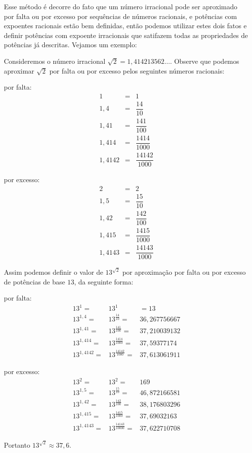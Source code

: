  Esse método é decorre do fato que um número irracional pode ser aproximado por falta ou por excesso por sequências de números racionais, e potências com expoentes racionais estão bem definidas, então podemos utilizar estes dois fatos e definir potências com expoente irracionais que satifazem todas as propriedades de potências já descritas. Vejamos um exemplo:
 
 \begin{exem}
 Consideremos o número irracional $\sqrt{2}= 1,414213562\ldots$. Observe que podemos aproximar $\sqrt{2}$ por falta ou por excesso pelos seguintes números racionais:
 
 \begin{multicols}{2}
 por falta:
 \begin{eqnarray*}
 1 &=& 1\\
 1,4 &=& \dfrac{14}{10} \\
 1,41 &=& \dfrac{141}{100} \\
 1,414 &=& \dfrac{1414}{1000} \\
 1,4142 &=& \dfrac{14142}{1000}
 \end{eqnarray*}
 
 por excesso:
 \begin{eqnarray*}
 2 &=& 2\\
 1,5 &=& \dfrac{15}{10} \\
 1,42 &=& \dfrac{142}{100} \\
 1,415 &=& \dfrac{1415}{1000} \\
 1,4143 &=& \dfrac{14143}{1000}
 \end{eqnarray*}
 \end{multicols} 
 
 Assim podemos definir o valor de $13^{\sqrt{2}}$ por aproximação por falta ou por excesso de potências de base $13$, da seguinte forma:
 
 por falta:
 \begin{eqnarray*}
 13^1 =& 13^1 &= 13\\
 13^{1,4} =& 13^{\frac{14}{10}} =& 36,267756667 \\
 13^{1,41} =& 13^{\frac{141}{100}} =& 37,210039132 \\
 13^{1,414} =& 13^{\frac{1414}{1000}} =& 37,59377174 \\
 13^{1,4142} =& 13^{\frac{14142}{1000}} =& 37,613061911
 \end{eqnarray*}
 
 por excesso:
 \begin{eqnarray*}
 13^{2} =& 13^{2} =& 169 \\
 13^{1,5} =& 13^{\frac{15}{10}} =& 46,872166581 \\
 13^{1,42} =& 13^{\frac{142}{100}} =& 38,176803296\\
 13^{1,415} =& 13^{\frac{1415}{1000}} =& 37,69032163 \\
 13^{1,4143} =& 13^{\frac{14143}{10000}} =& 37,622710708
 \end{eqnarray*}
 
 Portanto $13^{\sqrt{2}} \approx 37,6$.
 \end{exem}

